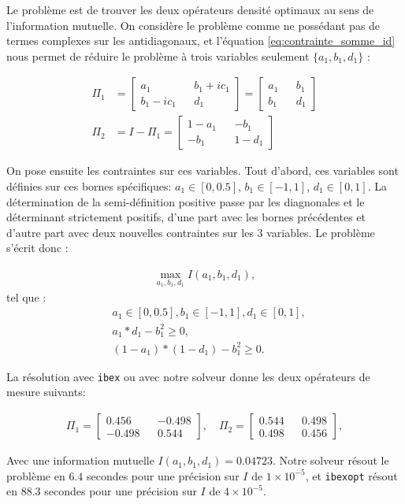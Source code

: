 Le problème est de trouver les deux opérateurs densité optimaux au sens de l'information mutuelle. On considère le problème comme ne possédant pas de termes complexes sur les antidiagonaux, et l'équation \ref{eq:contrainte_somme_id} nous permet de réduire le problème à trois variables seulement $\{a_1, b_1, d_1\}$ :

\begin{align}
    \Pi_1 &= \begin{bmatrix}a_1 && b_1 + ic_1 \\ b_1 - ic_1 && d_1\end{bmatrix} = \begin{bmatrix}a_1 && b_1 \\ b_1 && d_1\end{bmatrix} \\
    \Pi_2 &= I - \Pi_1 = \begin{bmatrix}1 - a_1 && -b_1 \\ -b_1 && 1 - d_1\end{bmatrix}
\end{align}

On pose ensuite les contraintes sur ces variables. Tout d'abord, ces variables sont définies sur ces bornes spécifiques: $a_1 \in [0, 0.5]$, $b_1 \in [-1, 1]$, $d_1 \in [0, 1]$. La détermination de la semi-définition positive passe par les diagnonales et le déterminant strictement positifs, d'une part avec les bornes précédentes et d'autre part avec deux nouvelles contraintes sur les 3 variables.
Le problème s'écrit donc :

\begin{align}
    \max\limits_{a_1, b_1, d_1} I(a_1, b_1, d_1) , \nonumber
\end{align}
tel que :
\begin{align}
    &a_1 \in [0, 0.5] , b_1 \in [-1, 1] , d_1 \in [0, 1] , \nonumber \\
    &a_1 * d_1 - b_1^2 \geq 0 , \nonumber \\
    &(1-a_1) * (1-d_1) - b_1^2 \geq 0. \nonumber
\end{align}

La résolution avec \texttt{ibex} ou avec notre solveur donne les deux opérateurs de mesure suivants: 

\begin{align}
    \Pi_1 = \begin{bmatrix}0.456 && -0.498 \\ -0.498 && 0.544\end{bmatrix}, \quad \Pi_2 = \begin{bmatrix}0.544 && 0.498 \\ 0.498 && 0.456\end{bmatrix},
\end{align}

Avec une information mutuelle $I(a_1, b_1, d_1) = 0.04723$. Notre solveur résout le problème en $6.4$ secondes pour une précision sur $I$ de $1 \times 10^{-5}$, et \texttt{ibexopt} résout en $88.3$ secondes pour une précision sur $I$ de $4\times 10^{-5}$.
